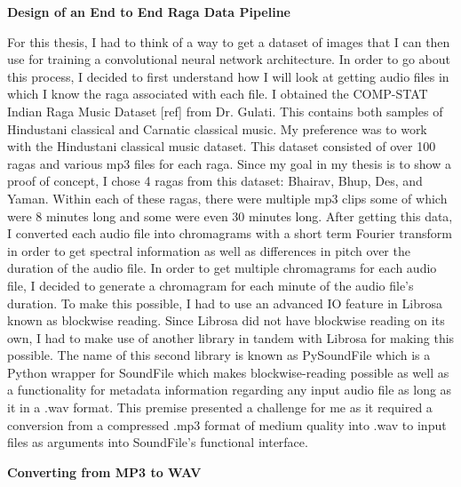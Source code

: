 \doublespacing
\setlength{\parindent}{1cm}

\begin{flushleft}
  \textbf{Design of an End to End Raga Data Pipeline}
\end{flushleft}

For this thesis, I had to think of a way to get a dataset of images that I can then use for training a convolutional neural network architecture. In order to go about this process, I decided to first understand how I will look at getting audio files in which I know the raga associated with each file. I obtained the COMP-STAT Indian Raga Music Dataset [ref] from Dr. Gulati. This contains both samples of Hindustani classical and Carnatic classical music. My preference was to work with the Hindustani classical music dataset. This dataset consisted of over 100 ragas and various mp3 files for each raga. Since my goal in my thesis is to show a proof of concept, I chose 4 ragas from this dataset: Bhairav, Bhup, Des, and Yaman. Within each of these ragas, there were multiple mp3 clips some of which were 8 minutes long and some were even 30 minutes long. After getting this data, I converted each audio file into chromagrams with a short term Fourier transform in order to get spectral information as well as differences in pitch over the duration of the audio file. In order to get multiple chromagrams for each audio file, I decided to generate a chromagram for each minute of the audio file's duration. To make this possible, I had to use an advanced I\/O feature in Librosa known as blockwise reading. Since Librosa did not have blockwise reading on its own, I had to make use of another library in tandem with Librosa for making this possible. The name of this second library is known as PySoundFile which is a Python wrapper for SoundFile which makes blockwise-reading possible as well as a functionality for metadata information regarding any input audio file as long as it in a .wav format. This premise presented a challenge for me as it required a conversion from a compressed .mp3 format of medium quality into .wav to input files as arguments into SoundFile's functional interface.

\begin{flushleft}
  \textbf{Converting from MP3 to WAV}
\end{flushleft}

